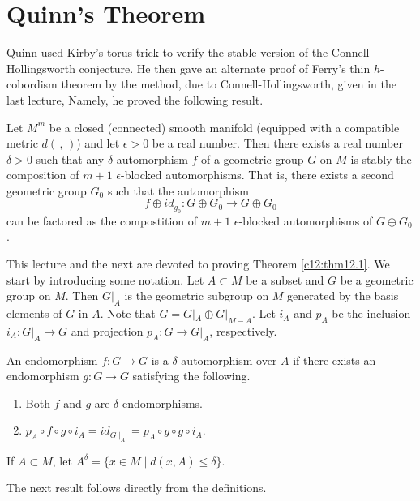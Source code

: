 \chapter{Quinn's Theorem}\label{c12}

Quinn\pageoriginale \cite{84} used Kirby's torus trick \cite{66} to verify the
stable version of the Connell-Hollingsworth conjecture. He then gave
an alternate proof of Ferry's thin $h$-cobordism theorem by the
method, due to Connell-Hollingsworth, given in the last lecture,
Namely, he proved the following result.

\begin{thm}\label{c12:thm12.1}
  Let $M^m$ be a closed (connected) smooth manifold (equi\-pped with a
  compatible metric $d(\,,\,)$) and let $\epsilon > 0$ be a real
  number. Then there exists a real number $\delta> 0$ such that any
  $\delta$-automorphism $f$ of a geometric group $G$ on $M$ is stably
  the composition of $m+1$ $\epsilon$-blocked automorphisms. That is,
  there exists a second geometric group $G_0$ such that the
  automorphism 
  $$
  f \oplus id_{g_0}: G \oplus G_0 \to G \oplus G_0
  $$
  can be factored as the compostition of $m+1$ $\epsilon$-blocked
  automorphisms of $G \oplus G_0$.
\end{thm}

This lecture and the next are devoted to proving Theorem
\ref{c12:thm12.1}. We start by introducing some notation. Let $A
\subset M$ be a subset and $G$ be a geometric group on $M$. Then
$G|_A$ is the geometric subgroup on $M$ generated by the basis
elements of $G$ in $A$. Note that $G=G|_A \oplus G|_{M-A}$. Let $i_A$
and $p_A$ be the inclusion $i_A : G|_A\to G$ and projection $p_A : G
\to G|_A$, respectively.

\begin{defi}\label{c12:defi12.2}
  An endomorphism $f: G\to G$ is a $\delta$-automorphism over $A$ if
  there exists an endomorphism $g: G \to G$ satisfying the following. 
  \begin{enumerate}
    \item Both $f$ and $g$ are $\delta$-endomorphisms.
      \item $p_A \circ f \circ g \circ i_A = id _{G\mid_{A}}= p_A
        \circ g \circ g\circ i_A$.
  \end{enumerate}
\end{defi}

If $A \subset M$, let $A^\delta= \{ x \in M \mid d(x, A)\leq
\delta\}$.

The next result follows directly from the definitions.

